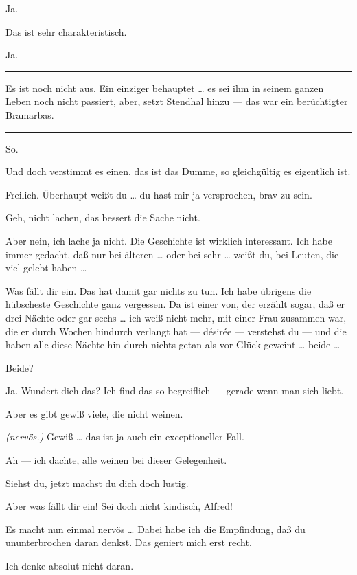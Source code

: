 \documentclass[
	final,
	a4paper,
	ngerman,
	mpinclude = true, %
	twoside = true,
	open = right,
	cleardoublepage = plain,
	DIV = 13,
	BCOR = 1cm,
	titlepage = firstiscover,
	]{scrbook}
\newcommand{\direction}[1]{\textit{(#1)}}
\newenvironment{deletion}{%
		\vspace{0.25\baselineskip}
		\hrule
		\vspace{0.25\baselineskip}
		\color{darkgray}
	}{
		\color{black}
		\vspace{0.25\baselineskip}
		\hrule 
		\vspace{0.25\baselineskip}
	}
\newcommand{\thecharacter}[1]{\textup{\textsc{#1}}\xspace}
\newcommand{\theherr}{\thecharacter{Benjamin}}
\newcommand{\thefrau}{\thecharacter{Emma}}
\newcommand{\character}[1]{\item[#1:]}
\newcommand{\herr}{\character{\theherr}}
\newcommand{\frau}{\character{\thefrau}}
\begin{document}
\begin{play}
	\frau
	Ja.

	\herr
	Das ist sehr charakteristisch.

	\frau
	Ja.
	\begin{deletion}

	\herr
	Es ist noch nicht aus. Ein einziger behauptet \ldots{} es sei ihm in seinem ganzen Leben noch nicht passiert, aber, setzt Stendhal hinzu --- das war ein berüchtigter Bramarbas.

	\frau
	\end{deletion}
	So. ---

	\herr
	Und doch verstimmt es einen, das ist das Dumme, so gleichgültig es eigentlich ist.

	\frau
	Freilich. Überhaupt weißt du \ldots{} du hast mir ja versprochen, brav zu sein.

	\herr
	Geh, nicht lachen, das bessert die Sache nicht.

	\frau
	Aber nein, ich lache ja nicht. Die Geschichte ist wirklich interessant. Ich habe immer gedacht, daß nur bei älteren \ldots{} oder bei sehr \ldots{} weißt du, bei Leuten, die viel gelebt haben \ldots{}

	\herr
	Was fällt dir ein. Das hat damit gar nichts zu tun. Ich habe übrigens die hübscheste Geschichte ganz vergessen. Da ist einer von, der erzählt sogar, daß er drei Nächte oder gar sechs \ldots{} ich weiß nicht mehr, mit einer Frau zusammen war, die er durch Wochen hindurch verlangt hat --- désirée --- verstehst du --- und die haben alle diese Nächte hin durch nichts getan als vor Glück geweint \ldots{} beide \ldots{}

	\frau
	Beide?

	\herr
	Ja. Wundert dich das? Ich find das so begreiflich --- gerade wenn man sich liebt.

	\frau
	Aber es gibt gewiß viele, die nicht weinen.

	\herr
	\direction{nervös.} Gewiß \ldots{} das ist ja auch ein exceptioneller Fall.

	\frau
	Ah --- ich dachte, alle weinen bei dieser Gelegenheit.

	\herr
	Siehst du, jetzt machst du dich doch lustig.

	\frau
	Aber was fällt dir ein! Sei doch nicht kindisch, Alfred!

	\herr
	Es macht nun einmal nervös \ldots{} Dabei habe ich die Empfindung, daß du ununterbrochen daran denkst. Das geniert mich erst recht.

	\frau
	Ich denke absolut nicht daran.


\end{play}
\end{document}
